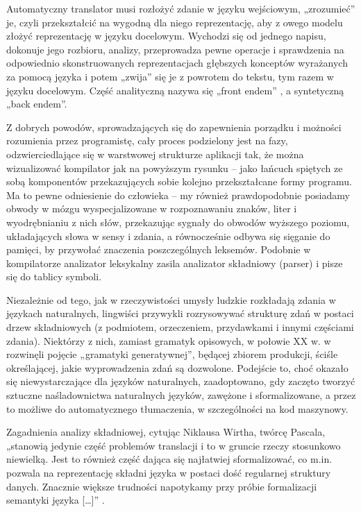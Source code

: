 Automatyczny translator musi rozłożyć zdanie w języku wejściowym, „zrozumieć” je, czyli przekształcić na wygodną dla niego reprezentację, aby z owego modelu złożyć reprezentację w języku docelowym. Wychodzi się od jednego napisu, dokonuje jego rozbioru, analizy, przeprowadza pewne operacje i sprawdzenia na odpowiednio skonstruowanych reprezentacjach głębszych konceptów wyrażanych za pomocą języka i potem „zwija” się je z powrotem do tekstu, tym razem w języku docelowym. Część analityczną nazywa się „front endem” , a syntetyczną „back endem”\cite[str.~4]{DRAGON_BOOK}.

Z dobrych powodów, sprowadzających się do zapewnienia porządku i możności rozumienia przez programistę, cały proces podzielony jest na fazy, odzwierciedlające się w warstwowej strukturze aplikacji tak, że można wizualizować kompilator jak na powyższym rysunku – jako łańcuch spiętych ze sobą komponentów przekazujących sobie kolejno przekształcane formy programu. Ma to pewne odniesienie do człowieka – my również prawdopodobnie posiadamy obwody w mózgu wyspecjalizowane w rozpoznawaniu znaków, liter i wyodrębnianiu z nich słów, przekazując sygnały do obwodów wyższego poziomu, układających słowa w sensy i zdania, a równocześnie odbywa się sięganie do pamięci, by przywołać znaczenia poszczególnych leksemów. Podobnie w kompilatorze analizator leksykalny zasila analizator składniowy (parser) i pisze się do tablicy symboli.

Niezależnie od tego, jak w rzeczywistości umysły ludzkie rozkładają zdania w językach naturalnych, lingwiści przywykli rozrysowywać strukturę zdań w postaci drzew składniowych (z podmiotem, orzeczeniem, przydawkami i innymi częściami zdania). Niektórzy z nich, zamiast gramatyk opisowych, w połowie XX w. w rozwinęli pojęcie „gramatyki generatywnej”, będącej zbiorem produkcji, ściśle określającej, jakie wyprowadzenia zdań są dozwolone\cite{Chomsky1956}. Podejście to, choć okazało się niewystarczające dla języków naturalnych, zaadoptowano, gdy zaczęto tworzyć sztuczne naśladownictwa naturalnych języków, zawężone i sformalizowane, a przez to możliwe do automatycznego tłumaczenia, w szczególności na kod maszynowy. 

Zagadnienia analizy składniowej,  cytując Niklausa Wirtha, twórcę Pascala, „stanowią jedynie część problemów translacji i to w gruncie rzeczy stosunkowo niewielką. Jest to również część dająca się najłatwiej sformalizować, co m.in. pozwala na reprezentację składni języka w postaci dość regularnej struktury danych. Znacznie większe trudności napotykamy przy próbie formalizacji semantyki języka […]” \cite[str.~317]{wirth_alogorytmy_struktury_danych}.


